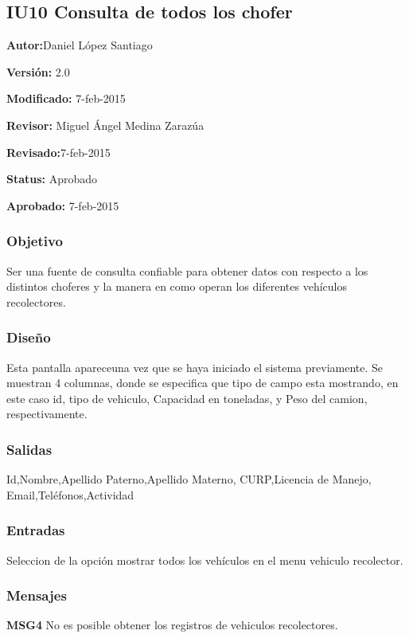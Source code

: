\subsection{IU10 Consulta de todos los chofer}

\begin{objetivos}
	\item {\bf Autor:}Daniel López Santiago 
	\item {\bf Versión:} 2.0
	\item {\bf Modificado:} 7-feb-2015
	\item {\bf Revisor:} Miguel Ángel Medina Zarazúa 
	\item {\bf Revisado:}7-feb-2015
	\item {\bf Status:} Aprobado
	\item {\bf Aprobado:} 7-feb-2015
\end{objetivos}

\subsubsection{Objetivo}

Ser una fuente de consulta confiable para obtener datos con respecto a los distintos choferes y la manera en como operan los diferentes vehículos recolectores.
\subsubsection{Diseño}
	Esta pantalla apareceuna vez que se haya iniciado el sistema previamente.
	Se muestran 4 columnas, donde se especifica que tipo de campo esta mostrando, en este caso id, tipo de vehiculo, Capacidad en toneladas, y Peso del camion, respectivamente.
	


\subsubsection{Salidas}

Id,Nombre,Apellido Paterno,Apellido Materno, CURP,Licencia de Manejo, Email,Teléfonos,Actividad

\subsubsection{Entradas}
Seleccion de la opción mostrar todos los vehículos en el menu vehiculo recolector.



\subsubsection{Mensajes}
	\begin{Citemize}
		\item {\bf MSG4} No es posible obtener los registros de vehiculos recolectores.
	\end{Citemize}